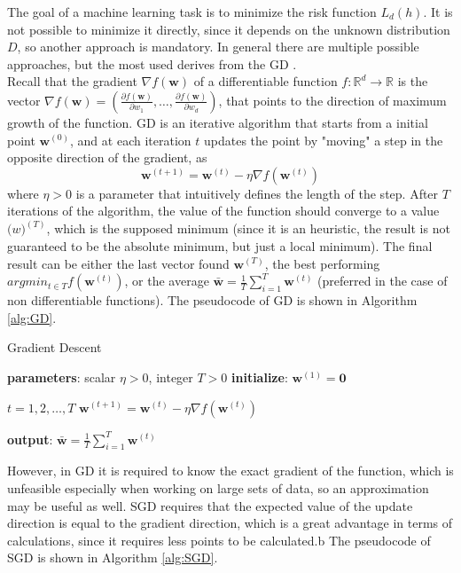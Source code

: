 The goal of a machine learning task is to minimize the risk function $L_d(h)$. It is not possible to minimize it directly, since it depends on the unknown distribution $D$, so another approach is mandatory. In general there are multiple possible approaches, but the most used derives from the \ac{GD} \cite{article-gs-sgd}. \\
Recall that the gradient $\nabla f(\mathbf{w})$ of a differentiable function $f: \mathbb{R}^d \rightarrow \mathbb{R}$ is the vector  $\nabla f(\mathbf{w}) = \left( \frac{\partial f(\mathbf{w})}{\partial w_1}, \dots, \frac{\partial f(\mathbf{w})}{\partial w_d} \right)$, that points to the direction of maximum growth of the function. \ac{GD} is an iterative algorithm that starts from a initial point $\mathbf{w}^{(0)}$, and at each iteration $t$ updates the point by "moving" a step in the opposite direction of the gradient, as
\[ \mathbf{w}^{(t+1)} = \mathbf{w}^{(t)} - \eta \nabla f(\mathbf{w}^{(t)}) \]
where $\eta > 0$ is a parameter that intuitively defines the length of the step. After $T$ iterations of the algorithm, the value of the function should converge to a value $\mathbf(w)^{(T)}$, which is the supposed minimum (since it is an heuristic, the result is not guaranteed to be the absolute minimum, but just a local minimum). The final result can be either the last vector found $\mathbf{w}^{(T)}$, the best performing $argmin_{t \in T} f(\mathbf{w}^{(t)})$, or the average $\mathbf{\bar{w}} = \frac{1}{T} \sum_{i=1}^{T} \mathbf{w}^{(t)}$ (preferred in the case of non differentiable functions). The pseudocode of \ac{GD} is shown in Algorithm \ref{alg:GD}.

\begin{algorithm}
\caption{Gradient Descent}\label{alg:GD}
\begin{algorithmic}[1]
	\State \textbf{parameters}: scalar $\eta > 0$, integer $T>0$
	\State \textbf{initialize}: $\mathbf{w}^{(1)} = \mathbf{0}$
	
	\For $t = 1, 2, \dots , T$
	\State $\mathbf{w}^{(t+1)} = \mathbf{w}^{(t)} - \eta \nabla f(\mathbf{w}^{(t)})$
	\EndFor
	
	\State \textbf{output}: $\mathbf{\bar{w}} = \frac{1}{T} \sum_{i=1}^{T} \mathbf{w}^{(t)}$
\end{algorithmic}
\end{algorithm}


However, in \ac{GD} it is required to know the exact gradient of the function, which is unfeasible especially when working on large sets of data, so an approximation may be useful as well. \ac{SGD} requires that the expected value of the update direction is equal to the gradient direction, which is a great advantage in terms of calculations, since it requires less points to be calculated.b The pseudocode of \ac{SGD} is shown in Algorithm \ref{alg:SGD}.

